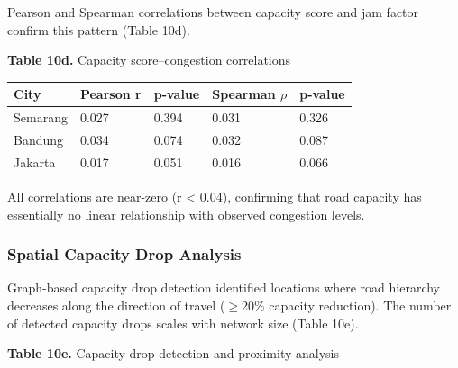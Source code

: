 \documentclass[12pt,a4paper]{article}
\begin{document}
Pearson and Spearman correlations between capacity score and jam factor confirm this pattern (Table 10d).

\textbf{Table 10d.} Capacity score--congestion correlations

\begin{longtable}[]{@{}lllll@{}}
\toprule\noalign{}
City & Pearson r & p-value & Spearman $\rho$ & p-value \\
\midrule\noalign{}
\endhead
\bottomrule\noalign{}
\endlastfoot
Semarang & 0.027 & 0.394 & 0.031 & 0.326 \\
Bandung & 0.034 & 0.074 & 0.032 & 0.087 \\
Jakarta & 0.017 & 0.051 & 0.016 & 0.066 \\
\end{longtable}

All correlations are near-zero (r < 0.04), confirming that road capacity has essentially no linear relationship with observed congestion levels.

\subsubsection{Spatial Capacity Drop Analysis}

Graph-based capacity drop detection identified locations where road hierarchy decreases along the direction of travel ($\geq$20\% capacity reduction). The number of detected capacity drops scales with network size (Table 10e).

\textbf{Table 10e.} Capacity drop detection and proximity analysis
\end{document}
